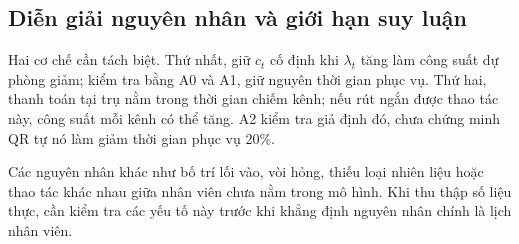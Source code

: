 \subsection{Diễn giải nguyên nhân và giới hạn suy luận}
Hai cơ chế cần tách biệt. Thứ nhất, giữ $c_t$ cố định khi $\lambda_t$ tăng
làm công suất dự phòng giảm; kiểm tra bằng A0 và A1, giữ nguyên thời gian
phục vụ. Thứ hai, thanh toán tại trụ nằm trong thời gian chiếm kênh; nếu
rút ngắn được thao tác này, công suất mỗi kênh có thể tăng. A2 kiểm tra giả
định đó, chưa chứng minh QR tự nó làm giảm thời gian phục vụ 20\%.

Các nguyên nhân khác như bố trí lối vào, vòi hỏng, thiếu loại nhiên liệu
hoặc thao tác khác nhau giữa nhân viên chưa nằm trong mô hình. Khi thu thập
số liệu thực, cần kiểm tra các yếu tố này trước khi khẳng định nguyên nhân
chính là lịch nhân viên.

